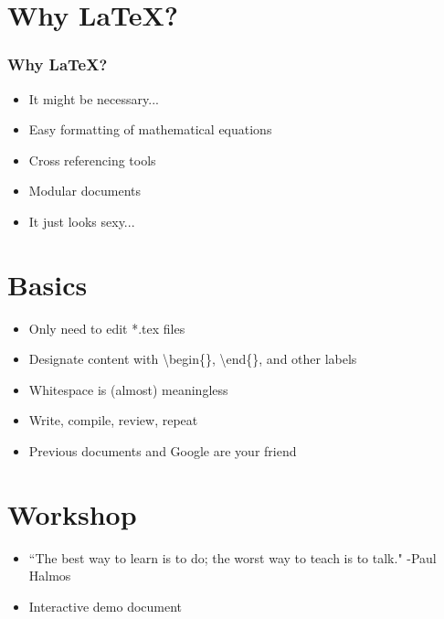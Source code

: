 \documentclass{beamer}
\begin{document}
\section{Why \LaTeX?}
\begin{frame}
	\frametitle{Why \LaTeX?}
    \begin{itemize}
		\item It might be necessary...
        \item Easy formatting of mathematical equations
        \item Cross referencing tools
		\item Modular documents
        \item It just looks sexy...
    \end{itemize}
\end{frame}

\section{Basics}
\begin{frame}
	\begin{itemize}
		\item Only need to edit *.tex files
		\item Designate content with \textbackslash begin\{\}, \textbackslash end\{\}, and other labels
		\item Whitespace is (almost) meaningless
		\item Write, compile, review, repeat
		\item Previous documents and Google are your friend
	\end{itemize}
\end{frame}

\section{Workshop}
\begin{frame}
	\begin{itemize}
		\item ``The best way to learn is to do; the worst way to teach is to talk." -Paul Halmos
		\item Interactive demo document
	\end{itemize}
\end{frame}



\end{document}
